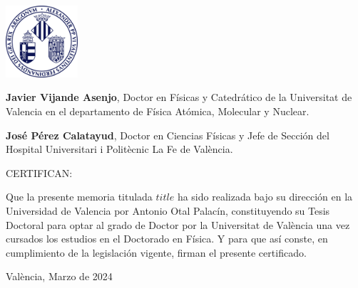 \thispagestyle{empty}
\vspace*{-1cm}
\includegraphics[width=0.2\textwidth]{logouni} %

\vspace{4ex}

\justify

\textbf{Javier Vijande Asenjo}, Doctor en Físicas y Catedrático de la Universitat de Valencia en el departamento de Física Atómica, Molecular y Nuclear.

\vspace{3ex}

\justify

\textbf{José Pérez Calatayud}, Doctor en Ciencias Físicas y Jefe de Sección del Hospital Universitari i Politècnic La Fe de València.

\vspace{5ex}

{\Large CERTIFICAN: }

\vspace{3ex}

\justify

Que la presente memoria titulada \emph{$title$} ha
sido realizada bajo su dirección en la Universidad de Valencia por Antonio Otal Palacín, constituyendo su Tesis Doctoral para optar al grado de Doctor por la
Universitat de València una vez cursados los estudios en el Doctorado en Física. Y para
que así conste, en cumplimiento de la legislación vigente, firman el presente certificado.

\vspace{5ex}

\justify

València, Marzo de 2024
\vfill %


\newpage
\thispagestyle{empty}
\begin{flushright}
\end{flushright}

